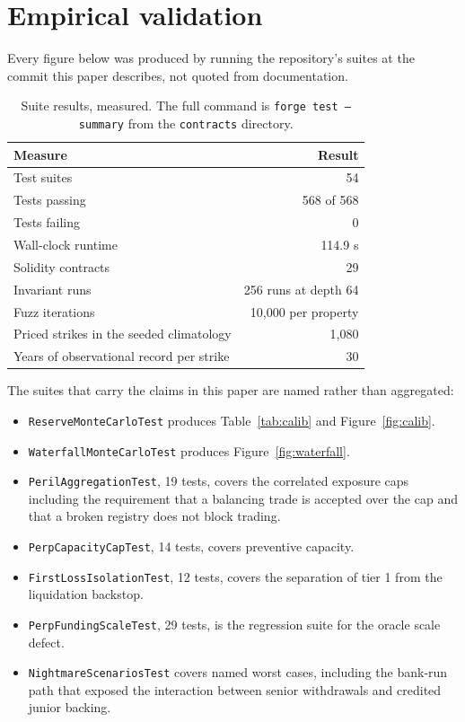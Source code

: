 \documentclass[11pt,a4paper]{article}
\newcommand{\code}[1]{\texttt{\small #1}}
\begin{document}
\section{Empirical validation}
\label{sec:validation}

Every figure below was produced by running the repository's suites at the commit this paper
describes, not quoted from documentation.

\begin{table}[h]
\centering
\small
\setlength{\tabcolsep}{9pt}
\renewcommand{\arraystretch}{1.25}
\begin{tabular}{@{}lr@{}}
\toprule
\textbf{Measure} & \textbf{Result} \\
\midrule
Test suites & 54 \\
Tests passing & 568 of 568 \\
Tests failing & 0 \\
Wall-clock runtime & 114.9 s \\
Solidity contracts & 29 \\
Invariant runs & 256 runs at depth 64 \\
Fuzz iterations & 10{,}000 per property \\
Priced strikes in the seeded climatology & 1{,}080 \\
Years of observational record per strike & 30 \\
\bottomrule
\end{tabular}
\caption{Suite results, measured. The full command is \code{forge test --summary} from the
\code{contracts} directory.}
\end{table}

The suites that carry the claims in this paper are named rather than aggregated:

\begin{itemize}[leftmargin=1.4em, itemsep=2pt]
\item \code{ReserveMonteCarloTest} produces Table~\ref{tab:calib} and Figure~\ref{fig:calib}.
\item \code{WaterfallMonteCarloTest} produces Figure~\ref{fig:waterfall}.
\item \code{PerilAggregationTest}, 19 tests, covers the correlated exposure caps including
the requirement that a balancing trade is accepted over the cap and that a broken registry
does not block trading.
\item \code{PerpCapacityCapTest}, 14 tests, covers preventive capacity.
\item \code{FirstLossIsolationTest}, 12 tests, covers the separation of tier 1 from the
liquidation backstop.
\item \code{PerpFundingScaleTest}, 29 tests, is the regression suite for the oracle scale
defect.
\item \code{NightmareScenariosTest} covers named worst cases, including the bank-run path
that exposed the interaction between senior withdrawals and credited junior backing.
\end{itemize}
\end{document}
